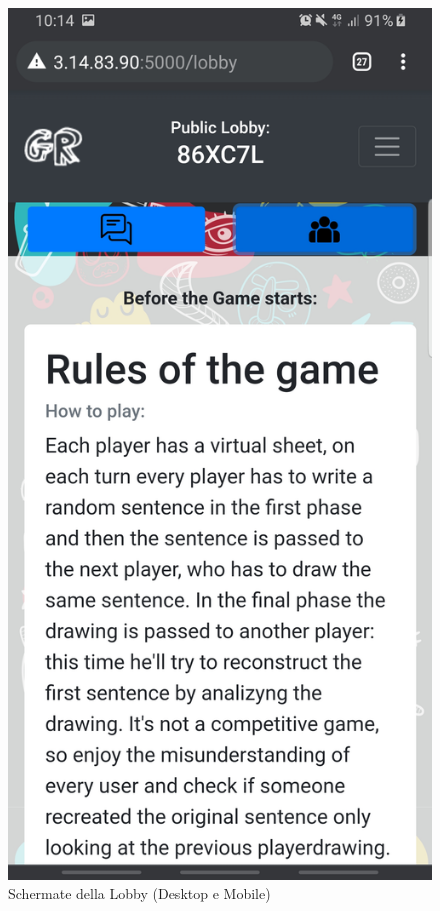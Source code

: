\begin{figure}[H]
\begin{minipage}[b]{0.2\textwidth}
    \includegraphics[width=\textwidth]{img/screen/M insideLobby.jpg}
  \end{minipage}
    \caption{Schermate della Lobby (Desktop e Mobile)}
\end{figure}

